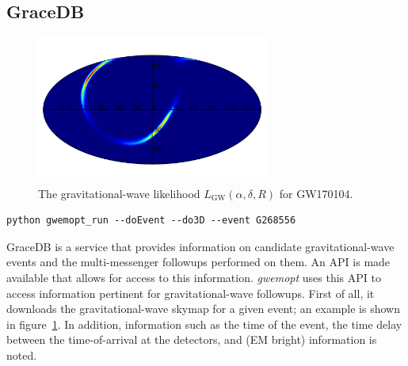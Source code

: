 \documentclass[twocolumn]{aastex61}
\newcommand{\rednote}[1]{{\color{red} (#1)}}
\begin{document}
\subsection{GraceDB}

\begin{figure}[t]
\hspace*{-0.5cm}
\centering
\includegraphics[width=3in]{prob.pdf}
\caption{The gravitational-wave likelihood $L_\textrm{GW}(\alpha,\delta,R)$ for GW170104.}
 \label{fig:skymap}
 \end{figure}

\begin{lstlisting}
python gwemopt_run --doEvent --do3D --event G268556
\end{lstlisting}

GraceDB is a service that provides information on candidate gravitational-wave events and the multi-messenger followups performed on them. An API is made available that allows for access to this information.
\emph{gwemopt} uses this API to access information pertinent for gravitational-wave followups.
First of all, it downloads the gravitational-wave skymap for a given event; an example is shown in figure~\ref{fig:skymap}.
In addition, information such as the time of the event, the time delay between the time-of-arrival at the detectors, and \rednote{EM bright} information is noted.
\end{document}
